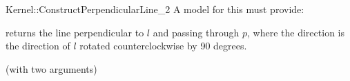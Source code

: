 \begin{ccRefFunctionObjectConcept}{Kernel::ConstructPerpendicularLine_2}
A model for this must provide:


        {returns the line perpendicular to $l$ and passing through $p$,
         where the direction is the direction of $l$ rotated 
         counterclockwise by 90 degrees.}

\ccRefines
{} (with two arguments)

\ccSeeAlso
{} \\

\end{ccRefFunctionObjectConcept}
